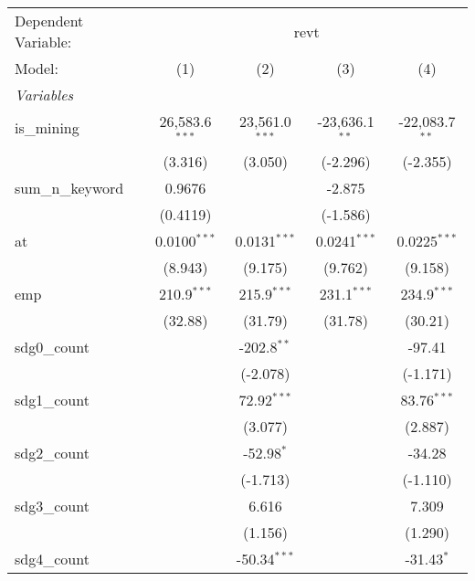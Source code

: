 
\begingroup
\centering
\begin{tabular}{lcccc}
   \tabularnewline \midrule \midrule
   Dependent Variable: & \multicolumn{4}{c}{revt}\\
   Model:            & (1)              & (2)              & (3)              & (4)\\  
   \midrule
   \emph{Variables}\\
   is\_mining        & 26,583.6$^{***}$ & 23,561.0$^{***}$ & -23,636.1$^{**}$ & -22,083.7$^{**}$\\   
                     & (3.316)          & (3.050)          & (-2.296)         & (-2.355)\\   
   sum\_n\_keyword   & 0.9676           &                  & -2.875           &   \\   
                     & (0.4119)         &                  & (-1.586)         &   \\   
   at                & 0.0100$^{***}$   & 0.0131$^{***}$   & 0.0241$^{***}$   & 0.0225$^{***}$\\   
                     & (8.943)          & (9.175)          & (9.762)          & (9.158)\\   
   emp               & 210.9$^{***}$    & 215.9$^{***}$    & 231.1$^{***}$    & 234.9$^{***}$\\   
                     & (32.88)          & (31.79)          & (31.78)          & (30.21)\\   
   sdg0\_count       &                  & -202.8$^{**}$    &                  & -97.41\\   
                     &                  & (-2.078)         &                  & (-1.171)\\   
   sdg1\_count       &                  & 72.92$^{***}$    &                  & 83.76$^{***}$\\   
                     &                  & (3.077)          &                  & (2.887)\\   
   sdg2\_count       &                  & -52.98$^{*}$     &                  & -34.28\\   
                     &                  & (-1.713)         &                  & (-1.110)\\   
   sdg3\_count       &                  & 6.616            &                  & 7.309\\   
                     &                  & (1.156)          &                  & (1.290)\\   
   sdg4\_count       &                  & -50.34$^{***}$   &                  & -31.43$^{*}$\\   

\end{tabular}
